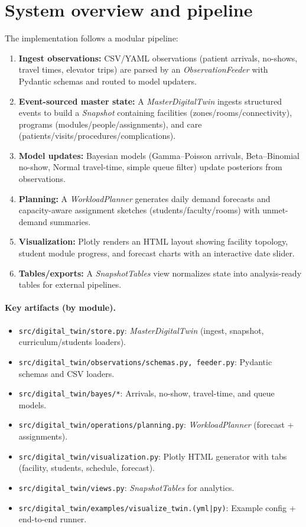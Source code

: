 \documentclass[Afour,sageh,times]{sagej}
\begin{document}
\section{System overview and pipeline}
The implementation follows a modular pipeline:
\begin{enumerate}[leftmargin=*,itemsep=2pt]
  \item \textbf{Ingest observations:} CSV/YAML observations (patient arrivals, no-shows, travel times, elevator trips) are parsed by an \emph{ObservationFeeder} with Pydantic schemas and routed to model updaters.
  \item \textbf{Event-sourced master state:} A \emph{MasterDigitalTwin} ingests structured events to build a \emph{Snapshot} containing facilities (zones/rooms/connectivity), programs (modules/people/assignments), and care (patients/visits/procedures/complications).
  \item \textbf{Model updates:} Bayesian models (Gamma–Poisson arrivals, Beta–Binomial no-show, Normal travel-time, simple queue filter) update posteriors from observations.
  \item \textbf{Planning:} A \emph{WorkloadPlanner} generates daily demand forecasts and capacity-aware assignment sketches (students/faculty/rooms) with unmet-demand summaries.
  \item \textbf{Visualization:} Plotly renders an HTML layout showing facility topology, student module progress, and forecast charts with an interactive date slider.
  \item \textbf{Tables/exports:} A \emph{SnapshotTables} view normalizes state into analysis-ready tables for external pipelines.
\end{enumerate}

\paragraph{Key artifacts (by module).}
\begin{itemize}[leftmargin=*,itemsep=2pt]
  \item \texttt{src/digital\_twin/store.py}: \emph{MasterDigitalTwin} (ingest, snapshot, curriculum/students loaders).
  \item \texttt{src/digital\_twin/observations/schemas.py, feeder.py}: Pydantic schemas and CSV loaders.
  \item \texttt{src/digital\_twin/bayes/*}: Arrivals, no-show, travel-time, and queue models.
  \item \texttt{src/digital\_twin/operations/planning.py}: \emph{WorkloadPlanner} (forecast + assignments).
  \item \texttt{src/digital\_twin/visualization.py}: Plotly HTML generator with tabs (facility, students, schedule, forecast).
  \item \texttt{src/digital\_twin/views.py}: \emph{SnapshotTables} for analytics.
  \item \texttt{src/digital\_twin/examples/visualize\_twin.(yml|py)}: Example config + end-to-end runner.
\end{itemize}
\end{document}
